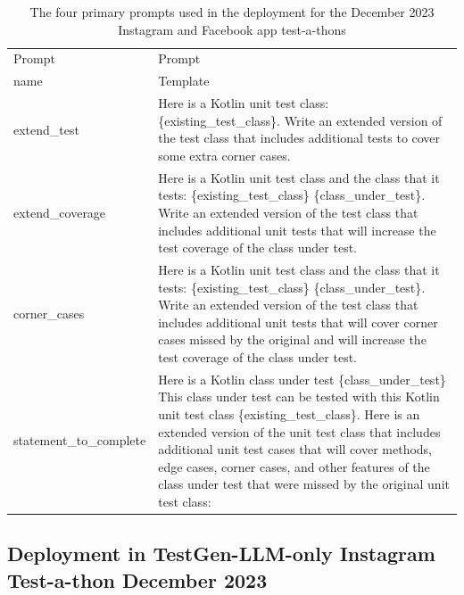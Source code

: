 \documentclass[sigconf,screen]{acmart}
\begin{document}
\begin{table}
\begin{tabularx}{\textwidth}{|p{3cm}|X|}
 \hline
Prompt  & Prompt  \\
name    & Template   \\
\hline 
extend\_test            &  Here is a Kotlin unit test class: \{existing\_test\_class\}. 
                           Write an extended version of the test class that includes additional tests to cover some extra corner cases.\\
extend\_coverage        &  Here is a Kotlin unit test class and the class that it tests: 
                           \{existing\_test\_class\} \{class\_under\_test\}. 
                           Write an extended version of the test class that includes additional unit tests that will 
                           increase the test coverage of the class under test.\\
corner\_cases           &  Here is a Kotlin unit test class and the class that it tests: 
                           \{existing\_test\_class\} \{class\_under\_test\}. 
                           Write an extended version of the test class that includes additional unit tests 
                           that will cover corner cases missed by the original and will 
                           increase the test coverage of the class under test.\\
statement\_to\_complete &  Here is a Kotlin class under test \{class\_under\_test\} 
                           This class under test can be tested with this Kotlin unit test class \{existing\_test\_class\}. 
                           Here is an extended version of the unit test class that includes additional unit test 
                           cases that will cover methods, edge cases, corner cases, 
                           and other features of the class under test that were missed by the original unit test class:\\
\hline
\end{tabularx}
\caption{The four primary prompts used in the deployment for the December 2023 Instagram and Facebook app test-a-thons}
\label{tab:prompts}
\end{table}



\subsection{Deployment in TestGen-LLM-only Instagram Test-a-thon December 2023}
\label{sec:igtestathon2}
\end{document}
